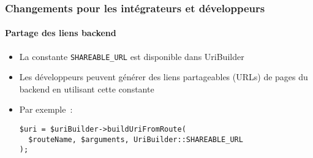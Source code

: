 %

\begin{frame}[fragile]
	\frametitle{Changements pour les intégrateurs et développeurs}
	\framesubtitle{Partage des liens backend}


	\begin{itemize}
		\item La constante \texttt{SHAREABLE\_URL} est disponible dans UriBuilder
		\item Les développeurs peuvent générer des liens partageables (URLs) de pages du backend en utilisant
			cette constante
		\item Par exemple~:
\begin{lstlisting}
$uri = $uriBuilder->buildUriFromRoute(
  $routeName, $arguments, UriBuilder::SHAREABLE_URL
);
\end{lstlisting}

	\end{itemize}

\end{frame}

